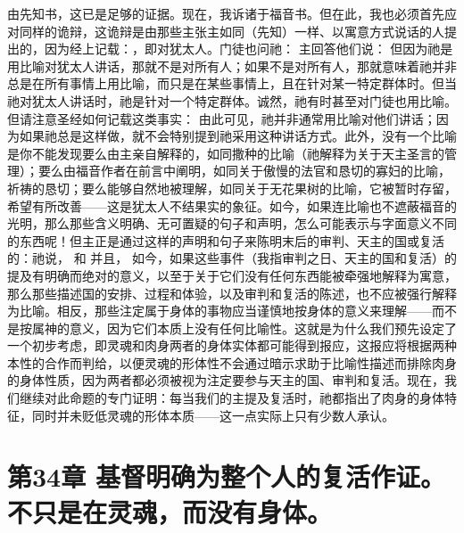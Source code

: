 由先知书，这已是足够的证据。现在，我诉诸于福音书。但在此，我也必须首先应对同样的诡辩，这诡辩是由那些主张主如同（先知）一样、以寓意方式说话的人提出的，因为经上记载：，即对犹太人。门徒也问祂： 主回答他们说： 但因为祂是用比喻对犹太人讲话，那就不是对所有人；如果不是对所有人，那就意味着祂并非总是在所有事情上用比喻，而只是在某些事情上，且在针对某一特定群体时。但当祂对犹太人讲话时，祂是针对一个特定群体。诚然，祂有时甚至对门徒也用比喻。但请注意圣经如何记载这类事实： 由此可见，祂并非通常用比喻对他们讲话；因为如果祂总是这样做，就不会特别提到祂采用这种讲话方式。此外，没有一个比喻是你不能发现要么由主亲自解释的，如同撒种的比喻（祂解释为关于天主圣言的管理）；要么由福音作者在前言中阐明，如同关于傲慢的法官和恳切的寡妇的比喻，祈祷的恳切；要么能够自然地被理解，如同关于无花果树的比喻，它被暂时存留，希望有所改善——这是犹太人不结果实的象征。如今，如果连比喻也不遮蔽福音的光明，那么那些含义明确、无可置疑的句子和声明，怎么可能表示与字面意义不同的东西呢！但主正是通过这样的声明和句子来陈明末后的审判、天主的国或复活的：祂说， 和 并且， 如今，如果这些事件（我指审判之日、天主的国和复活）的提及有明确而绝对的意义，以至于关于它们没有任何东西能被牵强地解释为寓意，那么那些描述国的安排、过程和体验，以及审判和复活的陈述，也不应被强行解释为比喻。相反，那些注定属于身体的事物应当谨慎地按身体的意义来理解——而不是按属神的意义，因为它们本质上没有任何比喻性。这就是为什么我们预先设定了一个初步考虑，即灵魂和肉身两者的身体实体都可能得到报应，这报应将根据两种本性的合作而判给，以便灵魂的形体性不会通过暗示求助于比喻性描述而排除肉身的身体性质，因为两者都必须被视为注定要参与天主的国、审判和复活。现在，我们继续对此命题的专门证明：每当我们的主提及复活时，祂都指出了肉身的身体特征，同时并未贬低灵魂的形体本质——这一点实际上只有少数人承认。\par


\section{第34章 基督明确为整个人的复活作证。不只是在灵魂，而没有身体。}

